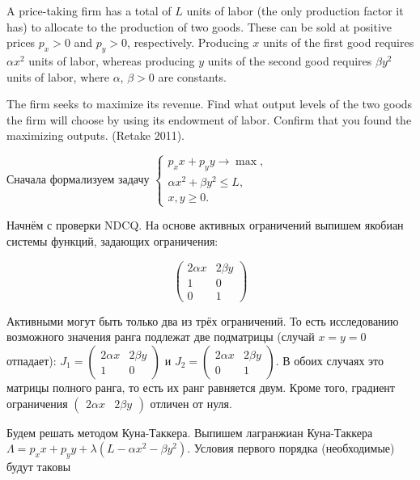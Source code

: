 \begin{problem}
A price-taking firm has a total of $L$ units of labor (the only production factor it has) to allocate to the production of two goods. These can be sold at positive prices $p_{x} >0$ and $p_{y} >0$, respectively. Producing $x$ units of the first good requires $\alpha x^{2} $ units of labor, whereas producing  $y$ units of the second good requires $\beta y^{2} $ units of labor, where $\alpha$, $\beta >0$ are constants.

The firm seeks to maximize its revenue. Find what output levels of the two goods the firm will choose by using its endowment of labor. Confirm that you found the maximizing outputs. (Retake 2011).


\begin{sol}
Сначала формализуем задачу $\left\{\begin{array}{c} {p_{x} x+p_{y} y\to \max ,} \\ {\alpha x^{2} +\beta y^{2} \le L,} \\ {x,y\ge 0.} \end{array}\right. $

Начнём с проверки NDCQ. На основе активных ограничений выпишем якобиан системы функций, задающих ограничения:

\[
\begin{pmatrix}
2\alpha x & 2\beta y \\
1 & 0 \\
0 & 1
\end{pmatrix}
\]

Активными могут быть только два из трёх ограничений. То есть исследованию возможного значения ранга подлежат две подматрицы (случай $x=y=0$ отпадает):
$J_1=\begin{pmatrix}
2\alpha x & 2\beta y \\
1 & 0
\end{pmatrix}$ и $J_2=\begin{pmatrix}
2\alpha x & 2\beta y \\
0 & 1
\end{pmatrix}$.
В обоих случаях это матрицы полного ранга, то есть их ранг равняется двум. Кроме того, градиент ограничения $\begin{pmatrix}
2\alpha x & 2\beta y
\end{pmatrix}$ отличен от нуля.

Будем решать методом Куна-Таккера. Выпишем лагранжиан Куна-Таккера $\Lambda =p_{x} x+p_{y} y+\lambda (L-\alpha x^{2} -\beta y^{2} )$. Условия первого порядка (необходимые) будут таковы


\end{sol}
\end{problem}
